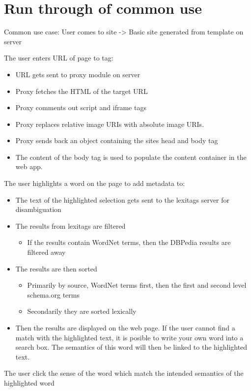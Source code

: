 \section{Run through of common use}
Common use case:
User comes to site -> Basic site generated from template on server

The user enters URL of page to tag:
\begin{itemize}
	\item URL gets sent to proxy module on server
	\item Proxy fetches the HTML of the target URL
	\item Proxy comments out script and iframe tags
	\item Proxy replaces relative image URIs with absolute image URIs.
	\item Proxy sends back an object containing the sites head and body tag
	\item The content of the body tag is used to populate the content container in the web app.
\end{itemize}
The user highlights a word on the page to add metadata to:
\begin{itemize}
	\item The text of the highlighted selection gets sent to the lexitags server for disambiguation
	\item The results from lexitags are filtered
	\begin{itemize}
		\item If the results contain WordNet terms, then the DBPedia results are filtered away
	\end{itemize}
	\item The results are then sorted
	\begin{itemize}
		\item Primarily by source, WordNet terms first, then the first and second level schema.org terms
		\item Secondarily they are sorted lexically
	\end{itemize}
	\item Then the results are displayed on the web page. If the user cannot find a match with the highlighted text,
	it is posible to write your own word into a search box.
	The semantics of this word will then be linked to the highlighted text.
\end{itemize}
The user click the sense of the word which match the intended semantics of the highlighted word
